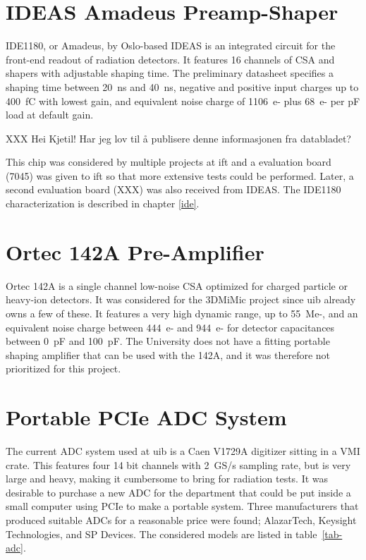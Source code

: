 \documentclass[../main/thesis.tex]{subfiles}
\begin{document}
\section{IDEAS Amadeus Preamp-Shaper}
\label{e-ide1180}
IDE1180, or Amadeus, by Oslo-based IDEAS is an integrated circuit for the front-end readout of radiation detectors. It features 16 channels of \gls{CSA} and shapers with adjustable shaping time. The preliminary datasheet \citep{IDE1180} specifies a shaping time between 20~ns and 40~ns, negative and positive input charges up to 400~fC with lowest gain, and equivalent noise charge of 1106~e- plus 68~e- per pF load at default gain. 

XXX Hei Kjetil! Har jeg lov til å publisere denne informasjonen fra databladet?

This chip was considered by multiple projects at \gls{ift} and a evaluation board (7045) was given to \gls{ift} so that more extensive tests could be performed. Later, a second evaluation board (XXX) was also received from IDEAS. The IDE1180 characterization is described in chapter \ref{ide}. 

\section{Ortec 142A Pre-Amplifier}
\label{e-ortec}
Ortec 142A is a single channel low-noise \gls{CSA} optimized for charged particle or heavy-ion detectors. It was considered for the 3DMiMic project since \gls{uib} already owns a few of these. It features a very high dynamic range, up to 55~Me-, and an equivalent noise charge between 444~e- and 944~e- for detector capacitances between 0~pF and 100~pF. 
The University does not have a fitting portable shaping amplifier that can be used with the 142A, and it was therefore not prioritized for this project. 


\section{Portable PCIe ADC System}
\label{e-adc}
The current \gls{ADC} system used at \gls{uib} is a Caen V1729A digitizer sitting in a VMI crate. This features four 14 bit channels with 2~GS/s sampling rate, but is very large and heavy, making it cumbersome to bring for radiation tests. It was desirable to purchase a new \gls{ADC} for the department that could be put inside a small computer using \gls{PCIe} to make a portable system. Three manufacturers that produced suitable \gls{ADC}s for a reasonable price were found; AlazarTech, Keysight Technologies, and SP Devices. The considered models are listed in table~\ref{tab-adc}. 
\end{document}
